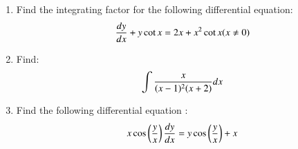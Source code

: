 \documentclass[12pt,-letter paper]{article}
\providecommand{\brak}[1]{\ensuremath{\left(#1\right)}}
\begin{document}
\begin{enumerate}
\item 
Find the integrating factor for the following differential equation:
\begin{align*}
\centering
\frac{dy}{dx}+ y \cot x = 2x+x^2 \cot x (x \neq 0)
\end{align*}

 
\item 
Find:
\begin{align*}    
\centering
\int\limits\frac{x}{(x-1)^2(x+2)} dx
\end{align*}


\item 
Find the following differential equation :
\begin{align*}
\centering
x\cos \brak{\frac{y}{x}} \frac{dy}{dx}=y \cos \brak{\frac{y}{x}}+x 
\end{align*}


\end{enumerate}
\end{document}
